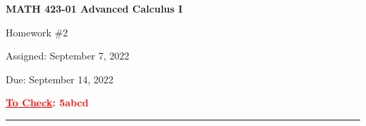 \documentclass[10pt]{article}
\begin{document}
\pagestyle{empty}  %

\begin{center}  %

{\bf MATH 423-01  Advanced Calculus I

Homework \#2

Assigned: September 7, 2022

Due: September 14, 2022}

\textbf{\textcolor{red}{\underline{To Check}: 5abcd}}

\end{center}

\medskip

\hrule   %

\bigskip

\end{document}
